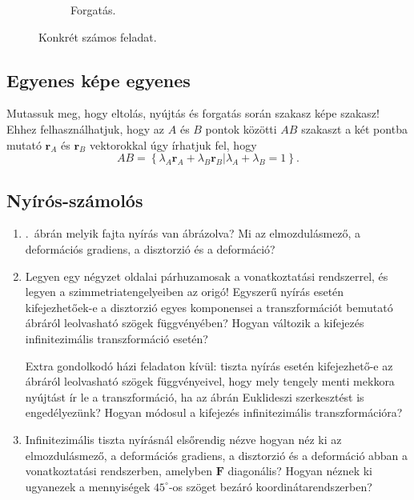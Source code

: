 \documentclass[12pt,a4paper]{scrartcl}
\let\mathbf\bm
\begin{document}
\begin{figure}[htb]
\begin{subfigure}[b]{0.45\textwidth}
\caption{Forgatás.}
\label{fig:forgatas_feladat}
\end{subfigure}
\label{fig:konret_szamos_feladat}
\caption{Konkrét számos feladat.}
\end{figure}
\FloatBarrier

\subsection{Egyenes képe egyenes}
Mutassuk meg, hogy eltolás, nyújtás és forgatás során szakasz képe szakasz! Ehhez felhasználhatjuk, hogy az $A$ és $B$ pontok közötti $AB$ szakaszt a két pontba mutató ${{\mathbf{r}}_A}$ és ${{\mathbf{r}}_B}$ vektorokkal úgy írhatjuk fel, hogy 
\[AB = \left\{ {\left. {{\lambda _A}{{\mathbf{r}}_A} + {\lambda _B}{{\mathbf{r}}_B}} \right|{\lambda _A} + {\lambda _B} = 1} \right\}.\]

\subsection{Nyírós-számolós}
\begin{enumerate}
\item {}.\ ábrán melyik fajta nyírás van ábrázolva? Mi az elmozdulásmező, a deformációs gradiens, a disztorzió és a deformáció?
\item Legyen egy négyzet oldalai párhuzamosak a vonatkoztatási rendszerrel, és legyen a szimmetriatengelyeiben az origó! Egyszerű nyírás esetén kifejezhetőek-e a disztorzió egyes komponensei a transzformációt bemutató ábráról leolvasható szögek függvényében? Hogyan változik a kifejezés infinitezimális transzformáció esetén?

Extra gondolkodó házi feladaton kívül: tiszta nyírás esetén kifejezhető-e az ábráról leolvasható szögek függvényeivel, hogy mely tengely menti mekkora nyújtást ír le a transzformáció, ha az ábrán Euklideszi szerkesztést is engedélyezünk? Hogyan módosul a kifejezés infinitezimális transzformációra?
\item Infinitezimális tiszta nyírásnál elsőrendig nézve hogyan néz ki az elmozdulásmező, a deformációs gradiens, a disztorzió és a deformáció abban a vonatkoztatási rendszerben, amelyben ${\mathbf{F}}$ diagonális? Hogyan néznek ki ugyanezek a mennyiségek $45^\circ$-os szöget bezáró koordinátarendszerben?
\end{enumerate}
\end{document}
